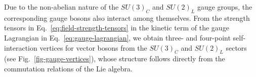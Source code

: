 %
Due to the non-abelian nature of the $SU(3)_C$ and $SU(2)_L$ gauge groups, the corresponding gauge bosons also interact among themselves. From the strength tensors in Eq.~\eqref{eq:field-strength-tensors} in the kinetic term of the gauge Lagrangian in Eq.~\eqref{eq:gauge-lagrangian}, we obtain three- and four-point self-interaction vertices for vector bosons from the $SU(3)_C$ and $SU(2)_L$ sectors (see Fig.~\ref{fig-gauge-vertices}), whose structure follows directly from the commutation relations of the Lie algebra.

